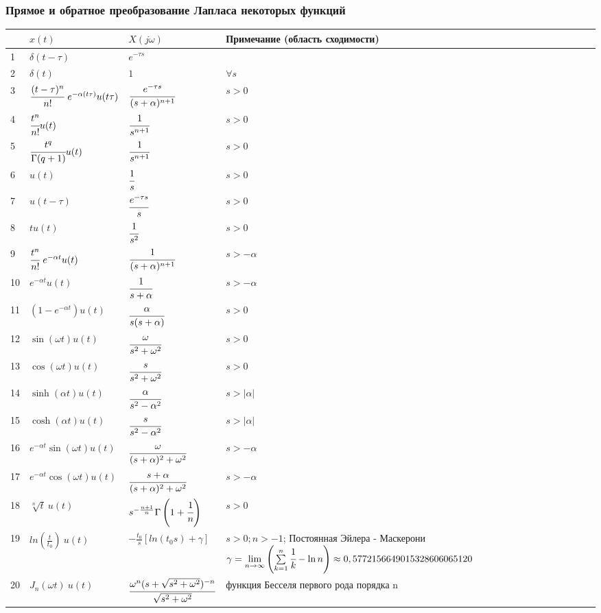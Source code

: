 \documentclass[12pt, a6paper]{extarticle}
\begin{document}
\subsubsection{Прямое и обратное преобразование Лапласа некоторых функций}
\begin{tabular}[c]{|p{0.3cm}|p{4.5cm}|p{4.5cm}|p{6cm}|}
\hline
 & $x(t)$ & $X(j\omega)$ & Примечание (область сходимости) \\ \hline
1 & $ \delta(t-\tau) $ & $ e^{-\tau s} $ & \\ \hline
2 & $ \delta(t) $ & $ 1 $ & $\forall s$ \\ \hline
3 & $ \cfrac{(t-\tau)^n}{n!}\ e^{-\alpha(t\tau)}u(t\tau) $ & $ \cfrac{e^{-\tau s}}{(s+\alpha)^{n+1}} $ & $ s>0$ \\ \hline
4 & $ \cfrac{t^n}{n!} u(t) $ & $ \cfrac{1}{s^{n+1}} $ & $s>0$ \\ \hline
5 & $ \cfrac{t^q}{\Gamma(q+1)} u(t) $ & $ \cfrac{1}{s^{n+1}} $ & $s>0$ \\ \hline
6 & $ u(t) $ & $ \cfrac{1}{s} $ &  $s>0$ \\ \hline
7 & $ u(t-\tau) $ & $ \cfrac{e^{-\tau s}}{s} $ & $s>0$ \\ \hline
8 & $ t u(t) $ & $ \cfrac{1}{s^2} $ &  $s>0$ \\ \hline
9 & $ \cfrac{t^n}{n!}\ e^{-\alpha t} u(t) $ & $ \cfrac{1}{(s+\alpha)^{n+1}} $ &  $s>-\alpha$  \\ \hline
10 & $ e^{-\alpha t} u(t) $ & $ \cfrac{1}{s+\alpha} $ &  $s>-\alpha$ \\ \hline
11 & $ (1-e^{-\alpha t}) u(t) $ & $ \cfrac{\alpha}{s(s+\alpha)} $ & $s>0$  \\ \hline
12 & $ \sin(\omega t) u(t) $ & $ \cfrac{\omega}{s^2+\omega^2} $ &  $s>0$ \\ \hline
13 & $ \cos(\omega t) u(t) $ & $ \cfrac{s}{s^2+\omega^2} $ &  $s>0$ \\ \hline
14 & $ \sinh(\alpha t) u(t) $ & $ \cfrac{\alpha}{s^2 - \alpha^2} $ & $s>|\alpha|$  \\ \hline
15 & $ \cosh(\alpha t) u(t) $ & $ \cfrac{s}{s^2 - \alpha^2}$ &  $s>|\alpha|$ \\ \hline
16 & $ e^{-\alpha t} \sin(\omega t) u(t) $ & $ \cfrac{\omega}{(s+\alpha)^2+\omega^2} $ & $s>-\alpha$ \\ \hline
17 & $ e^{-\alpha t} \cos(\omega t) u(t) $ & $ \cfrac{s+\alpha}{(s+\alpha)^2+\omega^2} $ & $s>-\alpha$ \\ \hline
18 & $ \sqrt[n]{t}\ u(t) $ & $ s^{-\frac{n+1}{n}}\Gamma \left( 1+\cfrac{1}{n} \right) $ &  $s>0$  \\ \hline
19 & $ ln(\frac{t}{t_0})\ u(t) $ & $ -\frac{t_0}{s} \left[ ln(t_0 s) + \gamma \right] $ &  $s>0; n>-1$; Постоянная Эйлера - Маскерони $\gamma = \lim\limits_{n \to \infty}{\left( \sum\limits_{k=1}^{n}{ \cfrac{1}{k} - \ln n }\right)} \approx 0,57721 56649 01532 86060 65120$ \\ \hline
20 & $ J_n(\omega t)\ u(t) $ & $ \cfrac{\omega
^n(s+\sqrt{s^2+\omega^2})^{-n}}{\sqrt{s^2+\omega^2}}  $ & функция Бесселя первого рода порядка n \\ \hline
\end{tabular}
\end{document}

